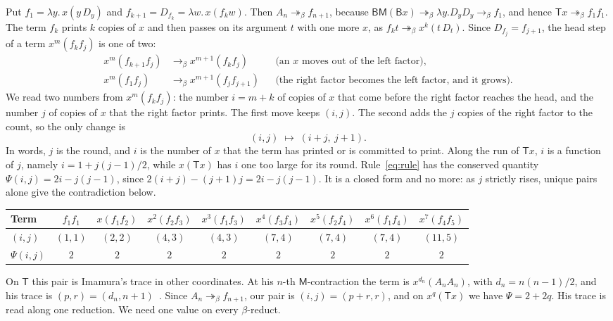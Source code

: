 \documentclass[a4paper,english]{lipics-v2021}
\newcommand{\B}{\mathsf{B}}
\newcommand{\M}{\mathsf{M}}
\newcommand{\T}{\mathsf{T}}
\newcommand{\bred}{\to_{\beta}}
\newcommand{\breds}{\twoheadrightarrow_{\beta}}
\newcommand{\Dd}[1]{D_{#1}}
\begin{document}
Put $f_1 = \lambda y.\,x(y\,\Dd{y})$ and $f_{k+1} = \Dd{f_k} = \lambda w.\,x(f_kw)$. Then $A_n \breds f_{n+1}$, because $\B\M(\B x) \breds \lambda y.\Dd{y}\Dd{y} \bred f_1$, and hence $\T x \breds f_1f_1$. The term $f_k$ prints $k$ copies of $x$ and then passes on its argument $t$ with one more $x$, as $f_kt \breds x^k(t\,\Dd{t})$. Since $\Dd{f_j} = f_{j+1}$, the head step of a term $x^m(f_kf_j)$ is one of two:
\begin{align*}
x^m(f_{k+1}f_j) &\bred x^{m+1}(f_kf_j) &&\text{(an $x$ moves out of the left factor),}\\
x^m(f_1f_j) &\bred x^{m+1}(f_jf_{j+1}) &&\text{(the right factor becomes the left factor, and it grows).}
\end{align*}
We read two numbers from $x^m(f_kf_j)$: the number $i = m+k$ of copies of $x$ that come before the right factor reaches the head, and the number $j$ of copies of $x$ that the right factor prints. The first move keeps $(i,j)$. The second adds the $j$ copies of the right factor to the count, so the only change is
\begin{equation}\label{eq:rule}
(i,j) \;\longmapsto\; (i+j,\ j+1).
\end{equation}
In words, $j$ is the round, and $i$ is the number of $x$ that the term has printed or is committed to print. Along the run of $\T x$, $i$ is a function of $j$, namely $i = 1 + j(j-1)/2$, while $x(\T x)$ has $i$ one too large for its round. Rule~\eqref{eq:rule} has the conserved quantity $\Psi(i,j) = 2i - j(j-1)$, since $2(i+j) - (j+1)j = 2i - j(j-1)$. It is a closed form and no more: as $j$ strictly rises, unique pairs alone give the contradiction below.
\begin{center}
\small
\begin{tabular}{@{}lcccccccc@{}}
\toprule
Term & $f_1f_1$ & $x(f_1f_2)$ & $x^2(f_2f_3)$ & $x^3(f_1f_3)$ & $x^4(f_3f_4)$ & $x^5(f_2f_4)$ & $x^6(f_1f_4)$ & $x^7(f_4f_5)$\\
\midrule
$(i,j)$ & $(1,1)$ & $(2,2)$ & $(4,3)$ & $(4,3)$ & $(7,4)$ & $(7,4)$ & $(7,4)$ & $(11,5)$\\
$\Psi(i,j)$ & $2$ & $2$ & $2$ & $2$ & $2$ & $2$ & $2$ & $2$\\
\bottomrule
\end{tabular}
\end{center}
On $\T$ this pair is Imamura's trace in other coordinates. At his $n$-th $\M$-contraction the term is $x^{d_n}(A_nA_n)$, with $d_n = n(n-1)/2$, and his trace is $(p,r) = (d_n, n+1)$~\cite[p.~14]{imamura1}. Since $A_n \breds f_{n+1}$, our pair is $(i,j) = (p+r,r)$, and on $x^q(\T x)$ we have $\Psi = 2 + 2q$. His trace is read along one reduction. We need one value on every $\beta$-reduct.
\end{document}
